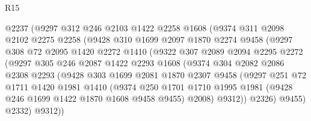 \begin{lexlean}{R15}
\begin{coremodule}
                  @2237
                  (@9297
                    @312
                    @246
                    @2103
                    @1422
                    @2258
                    @1608
                    (@9374
                      @311
                      @2098
                      @2102
                      @2275
                      @2258
                      (@9428
                        @310
                        @1699
                        @2097
                        @1870
                        @2274
                        @9458
                        (@9297
                          @308
                          @72
                          @2095
                          @1420
                          @2272
                          @1410
                          (@9322
                            @307
                            @2089
                            @2094
                            @2295
                            @2272
                            (@9297
                              @305
                              @246
                              @2087
                              @1422
                              @2293
                              @1608
                              (@9374
                                @304
                                @2082
                                @2086
                                @2308
                                @2293
                                (@9428
                                  @303
                                  @1699
                                  @2081
                                  @1870
                                  @2307
                                  @9458
                                  (@9297
                                    @251
                                    @72
                                    @1711
                                    @1420
                                    @1981
                                    @1410
                                    (@9374
                                      @250
                                      @1701
                                      @1710
                                      @1995
                                      @1981
                                      (@9428 @246 @1699 @1422 @1870 @1608 @9458 @9455)
                                      @2008)
                                    @9312))
                                @2326)
                              @9455)
                            @2332)
                          @9312))

\end{coremodule}
\end{lexlean}
